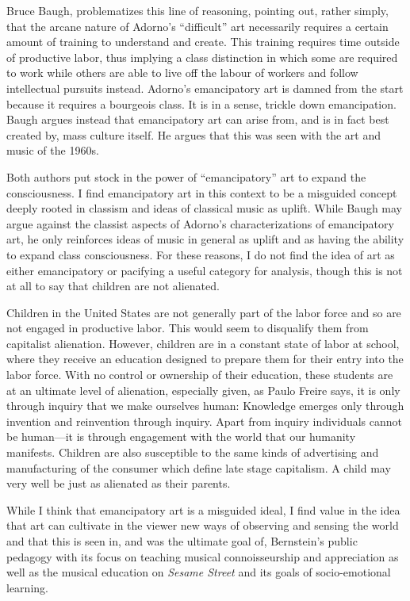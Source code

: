 \documentclass[12pt,letterpaper]{article}
\begin{document}
	Bruce Baugh, problematizes this line of reasoning, pointing out, rather
	simply, that the arcane nature of Adorno's ``difficult'' art necessarily
	requires a certain amount of training to understand and create. This 
	training requires time outside of productive labor, thus implying a 
	class distinction in which some are required to work while others are 
	able to live off the labour of workers and follow intellectual pursuits
	instead. Adorno's emancipatory art is damned from the start because it 
	requires a bourgeois class. \autocite[74]{Baugh} It is in a sense, 
	trickle down emancipation. Baugh argues instead that emancipatory art 
	can arise from,
	and is in fact best created by, mass culture itself. He argues that this
	was seen with the art and music of the 1960s.\autocite[77]{Baugh}

	Both authors put stock in the power of ``emancipatory'' art to expand 
	the consciousness. I find emancipatory art in this context to be a 
	misguided concept deeply rooted in classism and ideas of classical music
	as uplift. While Baugh may argue against the classist aspects of 
	Adorno's
	characterizations of emancipatory art, he only reinforces ideas of music
	in general 
	as uplift and as having the ability to expand class consciousness.
	For these reasons, I do not 
	find the idea of art as either emancipatory or pacifying a useful
	category for analysis, though this is not at all to say that children
	are not alienated. 

	Children in the United States are not generally part of the labor force 
	and so are not engaged in productive labor. This would seem to 
	disqualify them from capitalist alienation. However, children are in a 
	constant state of labor at school, where they receive an education 
	designed to prepare them for their entry into the labor force. With no 
	control or ownership of their education, these students are at an 
	ultimate level of alienation, especially given, as Paulo Freire says, 
	it is only through inquiry that we make ourselves human: Knowledge 
	emerges only through invention and reinvention through inquiry. Apart 
	from inquiry individuals cannot be human---it is through engagement 
	with the world that our humanity manifests.\autocite[72]{Freire}  
  	Children are also susceptible to the same kinds of advertising and 
	manufacturing of the consumer which define late stage capitalism.  
	A child may very well be just as alienated as their parents.  

	While I think that emancipatory art is a misguided ideal, I find value 
	in the idea that art can cultivate in the viewer new ways of observing
	and sensing the world and that this is seen in, and was the ultimate
	goal of, Bernstein's public pedagogy with its focus on teaching musical
	connoisseurship and appreciation as well as the musical education 
	on \textit{Sesame Street} and its goals of socio-emotional learning. 
\end{document}
